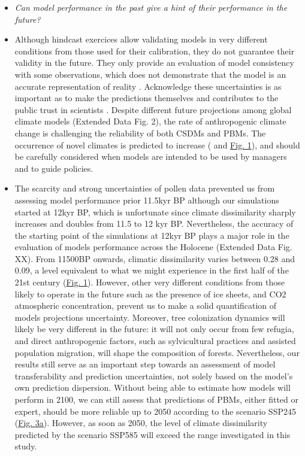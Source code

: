 \documentclass[pdflatex, sn-nature]{sn-jnl}%
\begin{document}
\begin{itemize}
\item \emph{Can model performance in the past give a hint of their performance in the future?}\par
\item Although hindcast exercices allow validating models in very different conditions from those used for their calibration, they do not guarantee their validity in the future. They only provide an evaluation of model consistency with some observations, which does not demonstrate that the model is an accurate representation of reality \cite{Oreskes1994}. Acknowledge these uncertainties is as important as to make the predictions themselves \cite{Beale2012} and contributes to the public trust in scientists \cite{Berkhout2010}. Despite different future projections among global climate models (Extended Data Fig. 2), the rate of anthropogenic climate change is challenging the reliability of both CSDMs and PBMs. The occurrence of novel climates is predicted to increase (\cite{Williams2007} and \hyperref[climatic_dissimilarity]{Fig. 1}), and should be carefully considered when models are intended to be used by managers and to guide policies.
\item The scarcity and strong uncertainties of pollen data prevented us from assessing model performance prior 11.5kyr BP although our simulations started at 12kyr BP, which is unfortunate since climate dissimilarity sharply increases and doubles from 11.5 to 12 kyr BP. Nevertheless, the accuracy of the starting point of the simulations at 12kyr BP plays a major role in the evaluation of models performance across the Holocene (Extended Data Fig. XX).  From 11500BP onwards, climatic dissimilarity varies between 0.28 and 0.09, a level equivalent to what we might experience in the first half of the 21st century (\hyperref[climatic_dissimilarity]{Fig. 1}). However, other very different  conditions from those likely to operate in the future such as the presence of ice sheets, and CO2 atmospheric concentration, prevent us to make a solid quantification of models projections uncertainty. Moreover, tree colonization dynamics will likely be very different in the future: it will not only occur from few refugia, and direct anthropogenic factors, such as sylvicultural practices and assisted population migration, will shape the composition of forests. Nevertheless, our results still serve as an important step towards an assessment of model transferability and prediction uncertainties, not solely based on the model's own prediction dispersion. Without being able to estimate how models will perform in 2100, we can still assess that predictions of PBMs, either fitted or expert, should be more reliable up to 2050 according to the scenario SSP245 (\hyperref[past_performance]{Fig. 3a}). However, as soon as 2050, the level of climate dissimilarity predicted by the scenario SSP585 will exceed the range investigated in this study. 


\end{itemize}
\end{document}
